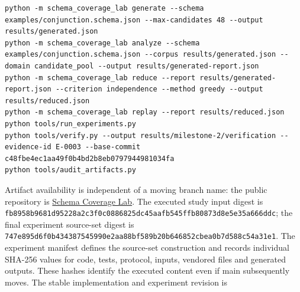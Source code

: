 \documentclass[sigconf,nonacm]{acmart}
\begin{document}
\begin{lstlisting}
python -m schema_coverage_lab generate --schema examples/conjunction.schema.json --max-candidates 48 --output results/generated.json
python -m schema_coverage_lab analyze --schema examples/conjunction.schema.json --corpus results/generated.json --domain candidate_pool --output results/generated-report.json
python -m schema_coverage_lab reduce --report results/generated-report.json --criterion independence --method greedy --output results/reduced.json
python -m schema_coverage_lab replay --report results/reduced.json
python tools/run_experiments.py
python tools/verify.py --output results/milestone-2/verification --evidence-id E-0003 --base-commit c48fbe4ec1aa49f0b4bd2b8eb0797944981034fa
python tools/audit_artifacts.py
\end{lstlisting}
Artifact availability is independent of a moving branch name: the public repository is \href{https://github.com/channi23/schema-coverage-lab}{Schema Coverage Lab}. The executed study input digest is \texttt{f\allowbreak{}b\allowbreak{}8\allowbreak{}9\allowbreak{}5\allowbreak{}8\allowbreak{}b\allowbreak{}9\allowbreak{}6\allowbreak{}8\allowbreak{}1\allowbreak{}d\allowbreak{}9\allowbreak{}5\allowbreak{}2\allowbreak{}2\allowbreak{}8\allowbreak{}a\allowbreak{}2\allowbreak{}c\allowbreak{}3\allowbreak{}f\allowbreak{}0\allowbreak{}c\allowbreak{}0\allowbreak{}8\allowbreak{}8\allowbreak{}6\allowbreak{}8\allowbreak{}2\allowbreak{}5\allowbreak{}d\allowbreak{}c\allowbreak{}4\allowbreak{}5\allowbreak{}a\allowbreak{}a\allowbreak{}f\allowbreak{}b\allowbreak{}5\allowbreak{}4\allowbreak{}5\allowbreak{}f\allowbreak{}f\allowbreak{}b\allowbreak{}8\allowbreak{}0\allowbreak{}8\allowbreak{}7\allowbreak{}3\allowbreak{}d\allowbreak{}8\allowbreak{}e\allowbreak{}5\allowbreak{}e\allowbreak{}3\allowbreak{}5\allowbreak{}a\allowbreak{}6\allowbreak{}6\allowbreak{}6\allowbreak{}d\allowbreak{}d\allowbreak{}c}; the final experiment source-set digest is \texttt{7\allowbreak{}4\allowbreak{}7\allowbreak{}e\allowbreak{}8\allowbreak{}9\allowbreak{}5\allowbreak{}d\allowbreak{}6\allowbreak{}f\allowbreak{}0\allowbreak{}b\allowbreak{}4\allowbreak{}3\allowbreak{}4\allowbreak{}3\allowbreak{}8\allowbreak{}7\allowbreak{}5\allowbreak{}4\allowbreak{}5\allowbreak{}9\allowbreak{}9\allowbreak{}0\allowbreak{}e\allowbreak{}2\allowbreak{}a\allowbreak{}a\allowbreak{}8\allowbreak{}8\allowbreak{}b\allowbreak{}f\allowbreak{}5\allowbreak{}8\allowbreak{}9\allowbreak{}b\allowbreak{}2\allowbreak{}0\allowbreak{}b\allowbreak{}6\allowbreak{}4\allowbreak{}6\allowbreak{}8\allowbreak{}5\allowbreak{}2\allowbreak{}c\allowbreak{}b\allowbreak{}e\allowbreak{}a\allowbreak{}0\allowbreak{}b\allowbreak{}7\allowbreak{}d\allowbreak{}5\allowbreak{}8\allowbreak{}8\allowbreak{}c\allowbreak{}5\allowbreak{}4\allowbreak{}a\allowbreak{}3\allowbreak{}1\allowbreak{}e\allowbreak{}1}. The experiment manifest defines the source-set construction and records individual SHA-256 values for code, tests, protocol, inputs, vendored files and generated outputs. These hashes identify the executed content even if main subsequently moves. The stable implementation and experiment revision is 
\end{document}
